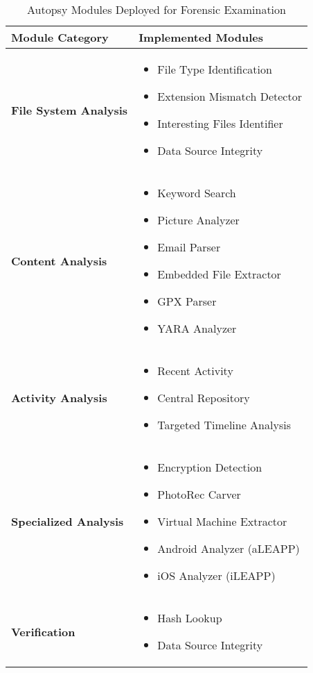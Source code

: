 \begin{table}[h]
\centering
\begin{tabular}{|p{5cm}|p{10cm}|}
\hline
\textbf{Module Category} & \textbf{Implemented Modules} \\
\hline
\textbf{File System Analysis} & 
\begin{itemize}
    \item File Type Identification
    \item Extension Mismatch Detector
    \item Interesting Files Identifier
    \item Data Source Integrity
\end{itemize} \\
\hline
\textbf{Content Analysis} & 
\begin{itemize}
    \item Keyword Search
    \item Picture Analyzer
    \item Email Parser
    \item Embedded File Extractor
    \item GPX Parser
    \item YARA Analyzer
\end{itemize} \\
\hline
\textbf{Activity Analysis} & 
\begin{itemize}
    \item Recent Activity
    \item Central Repository
    \item Targeted Timeline Analysis
\end{itemize} \\
\hline
\textbf{Specialized Analysis} & 
\begin{itemize}
    \item Encryption Detection
    \item PhotoRec Carver
    \item Virtual Machine Extractor
    \item Android Analyzer (aLEAPP)
    \item iOS Analyzer (iLEAPP)
\end{itemize} \\
\hline
\textbf{Verification} & 
\begin{itemize}
    \item Hash Lookup
    \item Data Source Integrity
\end{itemize} \\
\hline
\end{tabular}
\caption{Autopsy Modules Deployed for Forensic Examination}
\label{tab:autopsy_modules}
\end{table}


